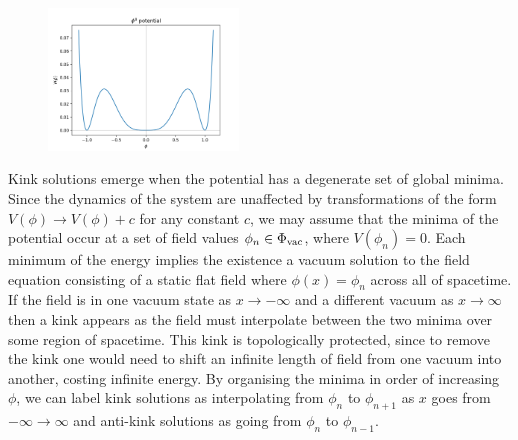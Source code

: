 \documentclass[11pt, oneside]{article}  	%
\numberwithin{equation}{section}
\begin{document}
 \begin{figure}
\centering
 \includegraphics[width=0.45\textwidth]{phi8_potential.png}
  \label{phi8pot}
\end{figure}
Kink solutions emerge when the potential has a degenerate set of global minima. Since the dynamics of the system are unaffected by transformations of the form $V(\phi)\rightarrow V(\phi) + c$ for any constant $c$, we may assume that the minima of the potential occur at a set of field values $\phi_n \in \Phi_{\textup{vac}}$, where $V(\phi_n) = 0$. Each minimum of the energy implies the existence a vacuum solution to the field equation consisting of a static flat field where $\phi(x) = \phi_n$ across all of spacetime. If the field is in one vacuum state as $x\rightarrow -\infty$ and a different vacuum as $x\rightarrow \infty$ then a kink appears as the field must interpolate between the two minima over some region of spacetime. This kink is topologically protected, since to remove the kink one would need to shift an infinite length of field from one vacuum into another, costing infinite energy. By organising the minima in order of increasing $\phi$, we can label kink solutions as interpolating from $\phi_n$ to $\phi_{n+1}$ as $x$ goes from $-\infty \rightarrow \infty$ and anti-kink solutions as going from $\phi_n$ to $\phi_{n-1}$.\par
\end{document}
